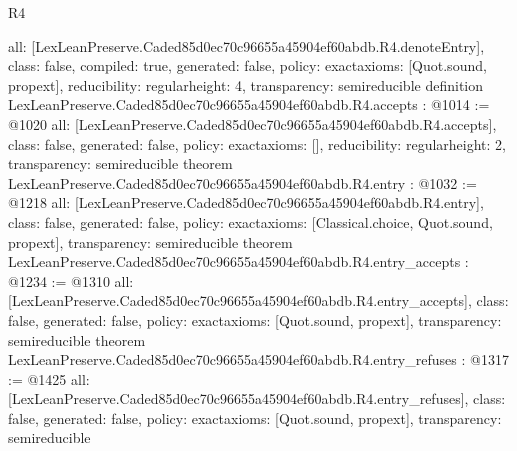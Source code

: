 \begin{lexlean}{R4}
\begin{coremodule}
{  all: [LexLeanPreserve.Caded85d0ec70c96655a45904ef60abdb.R4.denoteEntry],
  class: false,
  compiled: true,
  generated: false,
  policy: exact{axioms: [Quot.sound, propext]},
  reducibility: regular{height: 4},
  transparency: semireducible
}
definition LexLeanPreserve.Caded85d0ec70c96655a45904ef60abdb.R4.accepts : @1014 := @1020 {
  all: [LexLeanPreserve.Caded85d0ec70c96655a45904ef60abdb.R4.accepts],
  class: false,
  generated: false,
  policy: exact{axioms: []},
  reducibility: regular{height: 2},
  transparency: semireducible
}
theorem LexLeanPreserve.Caded85d0ec70c96655a45904ef60abdb.R4.entry : @1032 := @1218 {
  all: [LexLeanPreserve.Caded85d0ec70c96655a45904ef60abdb.R4.entry],
  class: false,
  generated: false,
  policy: exact{axioms: [Classical.choice, Quot.sound, propext]},
  transparency: semireducible
}
theorem LexLeanPreserve.Caded85d0ec70c96655a45904ef60abdb.R4.entry_accepts : @1234 := @1310 {
  all: [LexLeanPreserve.Caded85d0ec70c96655a45904ef60abdb.R4.entry_accepts],
  class: false,
  generated: false,
  policy: exact{axioms: [Quot.sound, propext]},
  transparency: semireducible
}
theorem LexLeanPreserve.Caded85d0ec70c96655a45904ef60abdb.R4.entry_refuses : @1317 := @1425 {
  all: [LexLeanPreserve.Caded85d0ec70c96655a45904ef60abdb.R4.entry_refuses],
  class: false,
  generated: false,
  policy: exact{axioms: [Quot.sound, propext]},
  transparency: semireducible
}


\end{coremodule}
\end{lexlean}

